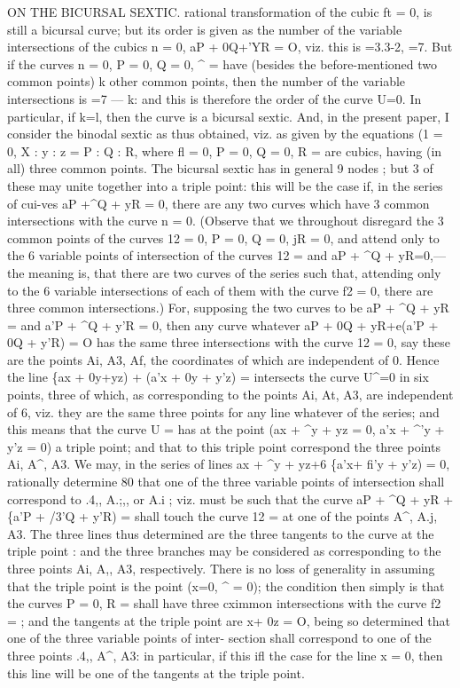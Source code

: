 \documentclass[12pt,a4paper]{article}
\begin{document}
ON THE BICURSAL SEXTIC.
rational
transformation
of
the
cubic
ft = 0,
is
still
a
bicursal
curve;
but
its
order
is
given as the number of the
variable
intersections of the cubics
n = 0,
aP + 0Q+'YR = O,
viz.
this
is =3.3-2, =7.
But
if the
curves n = 0, P = 0, Q = 0, \textasciicircum{} =
have (besides
the
before-mentioned
two common
points) k other common
points,
then
the number
of
the
variable
intersections
is =7 --- k:
and
this
is
therefore
the
order
of
the
curve
U=0.
In
particular,
if k=l, then the
curve
is a bicursal
sextic.
And,
in
the present
paper, I
consider
the
binodal
sextic
as
thus
obtained,
viz.
as
given by
the
equations
(1 = 0, X
: y
: z = P
: Q
: R, where
fl = 0, P = 0, Q = 0, R =
are cubics, having (in
all)
three common
points.
The
bicursal
sextic
has
in
general
9
nodes
;
but
3
of
these may
unite
together
into
a
triple
point:
this
will
be
the
case
if,
in the
series of
cui-ves aP +\textasciicircum{}Q + yR = 0,
there
are
any
two
curves
which
have
3 common
intersections
with
the
curve n = 0.
(Observe
that we
throughout
disregard
the
3
common
points
of
the
curves
12 = 0,
P = 0, Q = 0, jR = 0, and attend only to the 6
variable points of intersection of the curves
12 =
and aP + \textasciicircum{}Q + yR=0,--- the
meaning
is,
that
there
are
two
curves
of the
series
such
that,
attending
only
to
the
6
variable
intersections
of
each
of
them
with
the
curve
f2 = 0,
there
are
three common
intersections.)
For, supposing
the
two
curves
to
be aP + \textasciicircum{}Q + yR =
and a'P + \textasciicircum{}Q + y'R = 0, then any curve whatever
aP + 0Q + yR+e(a'P + 0Q + y'R) = O
has
the
same
three
intersections
with
the
curve
12 = 0,
say
these
are
the
points
Ai, A3, Af,
the coordinates
of which are independent
of
0.
Hence
the
line
\{ax + 0y+yz) +
(a'x + 0y + y'z) =
intersects
the
curve
U\textasciicircum{}=0
in
six
points,
three of
which, as corresponding
to the points
Ai,
At,
A3,
are
independent
of
6,
viz.
they
are
the
same
three
points
for
any
line
whatever of the
series;
and
this means
that the curve U =
has at the point
(ax + \textasciicircum{}y + yz = 0,
a'x + \textasciicircum{}'y + y'z = 0)
a
triple point;
and that
to
this
triple
point correspond the three points Ai, A\textasciicircum{}, A3.
We may, in the series of lines ax + \textasciicircum{}y + yz+6 \{a'x+ fi'y + y'z) = 0, rationally determine
80
that
one
of the
three
variable
points
of
intersection
shall
correspond
to
.4,,
A.;,,
or
A.i
;
viz.
must be such
that
the
curve aP + \textasciicircum{}Q + yR +
\{a'P + /3'Q + y'R) =
shall
touch the curve
12 =
at one
of the points A\textasciicircum{}, A.j, A3.
The three
lines thus determined
are the
three
tangents
to
the
curve
at
the
triple point
:
and
the
three branches may
be considered as corresponding to the three points Ai, A,, A3, respectively.
There
is
no
loss
of
generality
in
assuming
that
the
triple
point
is
the
point
(x=0,
\textasciicircum{} = 0);
the
condition
then
simply
is
that
the
curves P = 0, R =
shall
have
three
cximmon
intersections with
the
curve
f2 =
;
and the tangents at the
triple
point
are x+ 0z = O,
being
so
determined
that
one
of the
three
variable
points
of
inter-
section
shall
correspond
to
one
of the
three
points
.4,,
A\textasciicircum{},
A3:
in
particular,
if
this
ifl
the
case
for
the
line
x = 0,
then
this
line
will
be
one
of
the
tangents
at
the
triple
point.
\end{document}
